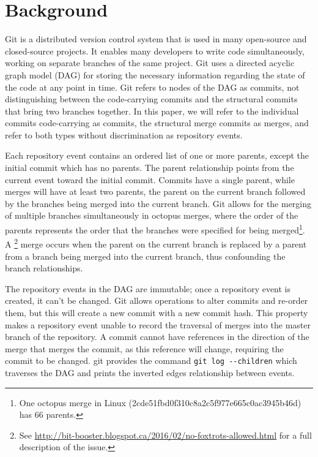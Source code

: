 
\section{Background}

Git is a distributed version control system that is used in many
open-source and closed-source projects. It enables many developers to
write code simultaneously, working on separate branches of the same
project. Git uses a directed acyclic graph model (DAG) for storing the
necessary information regarding the state of the code at any point in
time. Git refers to nodes of the DAG as commits, not distinguishing
between the code-carrying commits and the structural commits that bring
two branches together. In this paper, we will refer to the individual
commits code-carrying as commits, the structural merge commits as
merges, and refer to both types without discrimination as repository
events.

Each repository event contains an ordered list of one or more parents,
except the initial commit which has no parents. The parent relationship
points from the current event toward the initial commit.  Commits have a
single parent, while merges will have at least two parents, the parent
on the current branch followed by the branches being merged into the
current branch. Git allows for the merging of multiple branches
simultaneously in octopus merges, where the order of the parents
represents the order that the branches were specified for being merged\footnote{One octopus merge in Linux
  (2cde51fbd0f310c8a2c5f977e665c0ac3945b46d) has 66 parents.}.
A \foxtrot\footnote{See
  \url{http://bit-booster.blogspot.ca/2016/02/no-foxtrots-allowed.html}
  for a full description of the issue.} merge occurs when the parent on
the current branch is replaced by a parent from a branch being merged
into the current branch, thus confounding the branch relationships.

The repository events in the DAG are immutable; once a repository event
is created, it can't be changed. 
Git allows operations to alter commits
and re-order them, but this will create a new commit with a new commit
hash.  This property makes a repository event unable to record the
traversal of merges into the master branch of the repository. A commit
cannot have references in the direction of the merge that merges the
commit, as this reference will change, requiring the commit to be
changed.  git provides
the command \verb|git log --children| which traverses
the DAG and prints the inverted edges relationship between events.

